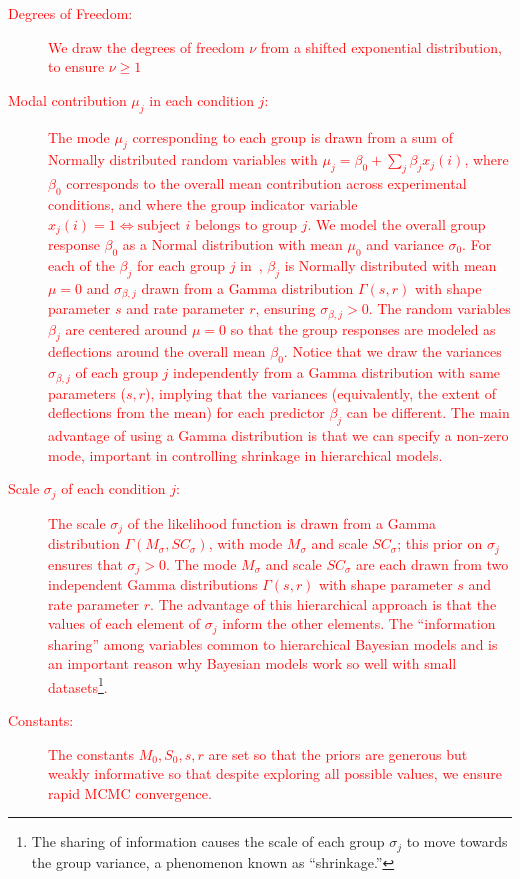 \textcolor{red}{\begin{description}
    \item[Degrees of Freedom:] We draw the degrees of freedom $\nu$ from a shifted exponential distribution, to ensure $\nu \geq 1$
    \item[Modal contribution $\mu_j$ in each condition $j$:] The mode $\mu_j$ corresponding to each group is drawn from a sum of Normally distributed random variables with $\mu_j = \beta_0 + \sum_j \beta_j x_j(i)$, where $\beta_0$ corresponds to the overall mean contribution across experimental conditions, and where the group indicator variable $x_j(i)=1 \iff \text{subject } i \text{ belongs to group } j$. We model the overall group response $\beta_0$ as a Normal distribution with mean $\mu_0$ and variance $\sigma_0$. For each of the $\beta_j$ for each group $j$ in~, $\beta_j$ is Normally distributed with mean $\mu=0$ and $\sigma_{\beta, j}$ drawn from a Gamma distribution $\Gamma(s,r)$ with shape parameter $s$ and rate parameter $r$, ensuring $\sigma_{\beta, j} > 0$. 
    The random variables $\beta_j$ are centered around $\mu=0$ so that the group responses are modeled as deflections around the overall mean $\beta_0$. Notice that we draw the variances $\sigma_{\beta, j}$ of each group $j$ independently from a Gamma distribution with same parameters ($s,r$), implying that the variances (equivalently, the extent of deflections from the mean) for each predictor $\beta_j$ can be different. The main advantage of using a Gamma distribution is that we can specify a non-zero mode, important in controlling shrinkage in hierarchical models. 
    \item[Scale $\sigma_j$ of each condition $j$:]  The scale $\sigma_j$ of the likelihood function is drawn from a Gamma distribution $\Gamma(M_{\sigma}, SC_{\sigma})$, with mode $M_{\sigma}$ and scale $SC_{\sigma}$; this prior on $\sigma_j$ ensures that $\sigma_j > 0$. The mode $M_{\sigma}$ and scale $SC_{\sigma}$ are each drawn from two independent Gamma distributions $\Gamma(s,r)$ with shape parameter $s$ and rate parameter $r$. The advantage of this hierarchical approach is that the values of each element of $\sigma_j$ inform the other elements. The ``information sharing'' among variables common to hierarchical Bayesian models and is an important reason why Bayesian models work so well with small datasets\footnote{The sharing of information causes the scale of each group $\sigma_{j}$ to move towards the group variance, a phenomenon known as ``shrinkage.'' }.
    \item[Constants:] The constants $M_0, S_0, s, r$ are set so that the priors are generous but weakly informative so that despite exploring all possible values, we ensure rapid MCMC convergence.
\end{description}}


